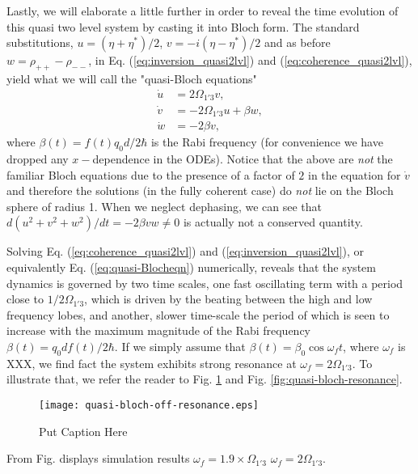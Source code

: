 \documentclass[]{spie}  %
\begin{document}
Lastly, we will elaborate a little further in order to reveal the time
evolution of this quasi two level system by casting it into Bloch form. The
standard substitutions, $u=(\eta + \eta^*)/2$, $v = -i(\eta - \eta^*)/2$ and as
before $w = \rho_{++}-\rho_{--}$, in Eq. (\ref{eq:inversion_quasi2lvl}) and
(\ref{eq:coherence_quasi2lvl}), yield what we will call the "quasi-Bloch
equations" \begin{subequations} \label{eq:quasi-Blocheqn} \begin{align} \dot{u}
 	&= 2\Omega_{1'3} v , \\ \dot{v} &= -2\Omega_{1'3} u +\beta w , \\ \dot{w} &=
 	-2\beta v, \end{align} \end{subequations} where $\beta(t) = f(t)q_0d/2\hbar$ is
the Rabi frequency (for convenience we have dropped any $x-$dependence in the
ODEs). Notice that the above are \emph{not} the familiar Bloch equations due to
the presence of a factor of $2$ in the equation for $\dot{v}$ and therefore the
solutions (in the fully coherent case) do \emph{not} lie on the Bloch sphere of
radius 1. When we neglect dephasing, we can see that $d(u^2+v^2+w^2)/dt =
-2\beta vw \neq 0$ is actually not a conserved quantity.


Solving Eq. (\ref{eq:coherence_quasi2lvl}) and (\ref{eq:inversion_quasi2lvl}),
or equivalently Eq. (\ref{eq:quasi-Blocheqn}) numerically, reveals that the
system dynamics is governed by two time scales, one fast oscillating term with
a period close to $1/2\Omega_{1'3}$, which is driven by the beating between the
high and low frequency lobes, and another, slower time-scale the period of
which is seen to increase with the maximum magnitude of the Rabi frequency
$\beta(t) = q_0df(t)/2\hbar$. If we simply assume that $\beta(t) = \beta_0
\cos\omega_f t$, where $\omega_f$ is XXX, we find fact the system exhibits
strong resonance at $\omega_f = 2\Omega_{1'3}$. To illustrate that, we refer
the reader to Fig. \ref{fig:quasi-bloch-off-resonance} and Fig.
\ref{fig:quasi-bloch-resonance}.  \begin{figure}[h!] \begin{center}
 		\texttt{[image: quasi-bloch-off-resonance.eps]} \caption{ Put
 			Caption Here } \label{fig:quasi-bloch-off-resonance} \end{center}
\end{figure} From Fig.  displays simulation results $\omega_f =
1.9\times\Omega_{1'3}$  $\omega_f = 2\Omega_{1'3}$.
\end{document}
